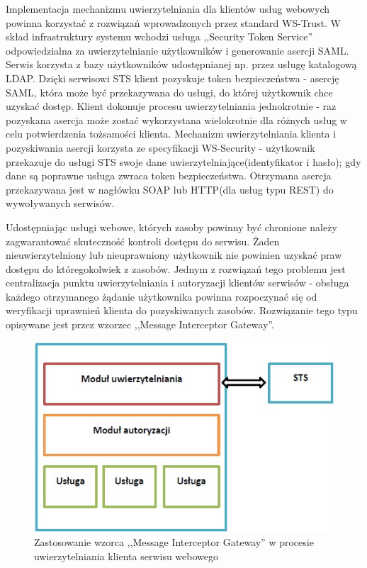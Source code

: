 		Implementacja mechanizmu uwierzytelniania dla klientów usług webowych powinna korzystać z rozwiązań wprowadzonych przez standard WS-Trust. W skład infrastruktury systemu wchodzi usługa ,,Security Token Service'' odpowiedzialna za uwierzytelnianie użytkowników i generowanie asercji SAML. Serwis korzysta z bazy użytkowników udostępnianej np. przez usługę katalogową LDAP. Dzięki serwisowi STS klient pozyskuje token bezpieczeństwa - asercję SAML, która może być przekazywana do usługi, do której użytkownik chce uzyskać dostęp. Klient dokonuje procesu uwierzytelniania jednokrotnie - raz pozyskana asercja może zostać wykorzystana wielokrotnie dla różnych usług w celu potwierdzenia tożsamości klienta. Mechanizm uwierzytelniania klienta i pozyskiwania asercji korzysta ze specyfikacji WS-Security - użytkownik przekazuje do usługi STS swoje dane uwierzytelniające(identyfikator i hasło); gdy dane są poprawne usługa zwraca token bezpieczeństwa. Otrzymana asercja przekazywana jest w nagłówku SOAP lub HTTP(dla usług typu REST) do wywoływanych serwisów.

		Udostępniając usługi webowe, których zasoby powinny być chronione należy zagwarantować skuteczność kontroli dostępu do serwisu. Żaden nieuwierzytelniony lub nieuprawniony użytkownik nie powinien uzyskać praw dostępu do któregokolwiek z zasobów. Jednym z rozwiązań tego problemu jest centralizacja punktu uwierzytelniania i autoryzacji klientów serwisów - obsługa każdego otrzymanego żądanie użytkownika powinna rozpoczynać się od weryfikacji uprawnień klienta do pozyskiwanych zasobów. Rozwiązanie tego typu opisywane jest przez wzorzec ,,Message Interceptor Gateway''. 

		\begin{figure}[h]
			\centering
			\includegraphics{img/interceptorGateway.jpg}
			\caption{Zastosowanie wzorca ,,Message Interceptor Gateway'' w procesie uwierzytelniania klienta serwisu webowego}
			\label{Zastosowanie wzorca ,,Message Interceptor Gateway'' w procesie uwierzytelniania klienta serwisu webowego}
		\end{figure}

